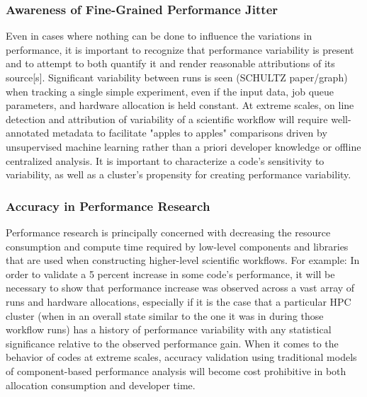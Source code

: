\subsubsection{Awareness of Fine-Grained Performance Jitter}
  Even in cases where
nothing can be done to influence the variations in performance, it is
important to recognize that performance variability is present and to
attempt to both quantify it and render reasonable attributions of its
source[s]. Significant variability between runs is seen (SCHULTZ
paper/graph) when tracking a single simple experiment, even if the
input data, job queue parameters, and hardware allocation is held
constant. At extreme scales, on line detection and attribution of
variability of a scientific workflow will require well-annotated
metadata to facilitate "apples to apples" comparisons driven by
unsupervised machine learning rather than a priori developer knowledge
or offline centralized analysis. It is important to characterize a
code's sensitivity to variability, as well as a cluster's propensity
for creating performance variability.

\subsubsection{Accuracy in Performance Research}
 Performance research is
principally concerned with decreasing the resource consumption and
compute time required by low-level components and libraries that are
used when constructing higher-level scientific workflows. For example:
In order to validate a 5 percent increase in some code's performance,
it will be necessary to show that performance increase was observed
across a vast array of runs and hardware allocations, especially if it
is the case that a particular HPC cluster (when in an overall state
similar to the one it was in during those workflow runs) has a history
of performance variability with any statistical significance relative
to the observed performance gain. When it comes to the behavior of
codes at extreme scales, accuracy validation using traditional models
of component-based performance analysis will become cost prohibitive
in both allocation consumption and developer time.

